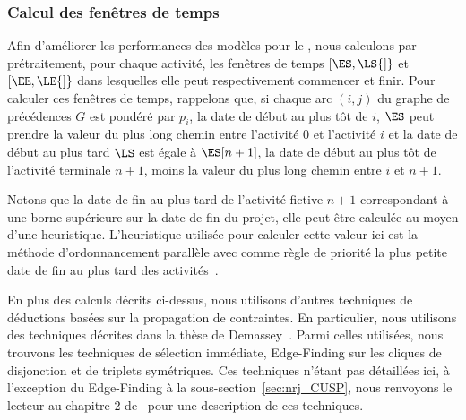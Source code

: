 \subsubsection{Calcul des fenêtres de temps}

Afin d'améliorer les performances des modèles pour le \RCPSP, nous
calculons par prétraitement, pour chaque activité, les fenêtres de
temps $[\ES,\LS{]}$ et $[\EE,\LE{]}$ dans lesquelles elle peut
respectivement commencer et finir. Pour calculer ces fenêtres de
temps, rappelons que, si chaque arc $(i,j)$ du graphe de précédences
$G$ est pondéré par $p_i$, la date de début au plus tôt de $i$, $\ES$
peut prendre la valeur du plus long chemin entre l'activité $0$ et
l'activité $i$ et la date de début au plus tard $\LS$ est égale à
$\ES[n+1]$, la date de début au plus tôt de l'activité terminale
$n+1$, moins la valeur du plus long chemin entre $i$ et $n+1$.

Notons que la date de fin au plus tard de l'activité fictive $n+1$
correspondant à une borne supérieure sur la date de fin du projet,
elle peut être calculée au moyen d'une heuristique. L'heuristique
utilisée pour calculer cette valeur ici est la méthode
d'ordonnancement parallèle avec comme règle de priorité la plus petite
date de fin au plus tard des activités~\cite{heur_RCPSP}.

En plus des calculs décrits ci-dessus, nous utilisons d'autres
techniques de déductions basées sur la propagation de contraintes. En
particulier, nous utilisons des techniques décrites dans la thèse de
Demassey~\cite{these_Sophie}. Parmi celles utilisées, nous trouvons
les techniques de sélection immédiate, Edge-Finding sur les cliques de
disjonction et de triplets symétriques. Ces techniques n'étant pas
détaillées ici, à l'exception du Edge-Finding à la
sous-section~\ref{sec:nrj_CUSP}, nous renvoyons le lecteur au chapitre
2 de~\cite{these_Sophie} pour une description de ces techniques.
